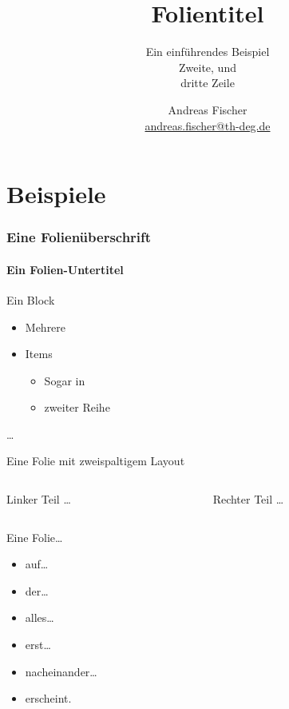 \documentclass[t,
aspectratio=169,  %
]{beamer}
\title{Folientitel}
\subtitle{Ein einführendes Beispiel\\ Zweite, und\\ dritte Zeile}
\author[A. Fischer]  %
       {Andreas Fischer \\  %
	\href{mailto:andreas.fischer@th-deg.de}{andreas.fischer@th-deg.de}}
\begin{document}
\begin{frame}
\titlepage{}
\end{frame}

\section{Beispiele}

\begin{frame}
\frametitle{Eine Folienüberschrift}
\framesubtitle{Ein Folien-Untertitel}

\begin{block}{Ein Block}
	\begin{itemize}
		\item Mehrere
		\item Items
		\begin{itemize}
			\item Sogar in
			\item zweiter Reihe
		\end{itemize}
	\end{itemize}
\end{block}

\ldots
\end{frame}

\begin{frame}{Eine Folie mit zweispaltigem Layout}
	\begin{columns}[T]
	\begin{column}[T]{.45\linewidth}
		\begin{block}{Linker Teil}
			\ldots
		\end{block}
	\end{column}
	\begin{column}[T]{.45\linewidth}
		\begin{block}{Rechter Teil}
			\ldots
		\end{block}
	\end{column}
	\end{columns}
\end{frame}

\begin{frame}{Eine Folie\ldots}
	\begin{itemize}[<+->]
		\item auf\ldots
		\item der\ldots
		\item alles\ldots
		\item erst\ldots
		\item nacheinander\ldots
		\item erscheint.
	\end{itemize}
\end{frame}
\end{document}
